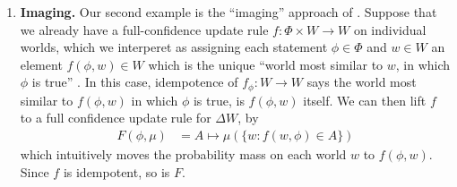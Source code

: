 \begin{enumerate}[wide, label=\textbf{\thesubsection.\arabic*}]
	\item
	\textbf{Imaging.}
	Our second example is the ``imaging''
	approach of \textcite{lewis1976probabilities}.
	Suppose that
 	we already have a full-confidence update rule
	$f : \Phi \times W \to W$ on individual worlds, which we interperet as assigning each statement $\phi \in \Phi$ and $w \in W$ an element $f(\phi, w) \in W$ which is the unique ``world most similar to $w$, in which $\phi$ is true'' \parencite{gardenfors1979imaging}.
	In this case, idempotence of $f_\phi: W \to W$
	says the world most similar to $f(\phi,w)$ in which $\phi$ is true, is $f(\phi,w)$ itself.
	We can then 
	lift $f$ to a full confidence update rule for $\Delta W$,
	by
	\[
    	\begin{aligned}
    		F(\phi, \mu) 
    			&= A \mapsto \mu(\{w : f(w, \phi) \in A\})
    	\end{aligned}
	\]
	which intuitively moves the probability mass on each world $w$ to
	$f(\phi,w)$.	
	Since $f$ is idempotent, so is $F$.


\end{enumerate}
